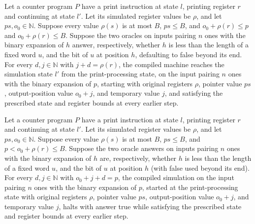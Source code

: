 \begin{lemma}
\label{Complexity.CPSim.pr_reach}
\leanok
{}
Let a counter program $P$ have a print instruction at state $l$, printing register $r$
and continuing at state $l'$. Let its simulated register values be $\rho$, and let
$ps,o_0\in\mathbb{N}$. Suppose every value $\rho(s)$ is at most $B$, $ps\le B$, and
$o_0+\rho(r)\le p$ and $o_0+\rho(r)\le B$. Suppose the two oracles on inputs pairing $n$
ones with the binary expansion of $h$ answer, respectively, whether $h$ is less than the
length of a fixed word $u$, and the bit of $u$ at position $h$, defaulting to false
beyond its end. For every $d,j\in\mathbb{N}$ with $j+d=\rho(r)$, the compiled machine
reaches the simulation state $l'$ from the print-processing state, on the input pairing
$n$ ones with the binary expansion of $p$, starting with original registers $\rho$,
pointer value $ps$, output-position value $o_0+j$, and temporary value $j$, and
satisfying the prescribed state and register bounds at every earlier step.
\end{lemma}

\begin{lemma}
\label{Complexity.CPSim.pr_halt}
\leanok
{}
Let a counter program $P$ have a print instruction at state $l$, printing register $r$
and continuing at state $l'$. Let its simulated register values be $\rho$, and let
$ps,o_0\in\mathbb{N}$. Suppose every value $\rho(s)$ is at most $B$, $ps\le B$, and
$p<o_0+\rho(r)\le B$. Suppose the two oracle answers on inputs pairing $n$ ones with the
binary expansion of $h$ are, respectively, whether $h$ is less than the length of a
fixed word $u$, and the bit of $u$ at position $h$ (with false used beyond its end). For
every $d,j\in\mathbb{N}$ with $o_0+j+d=p$, the compiled simulation on the input pairing
$n$ ones with the binary expansion of $p$, started at the print-processing state with
original registers $\rho$, pointer value $ps$, output-position value $o_0+j$, and
temporary value $j$, halts with answer true while satisfying the prescribed state and
register bounds at every earlier step.
\end{lemma}

